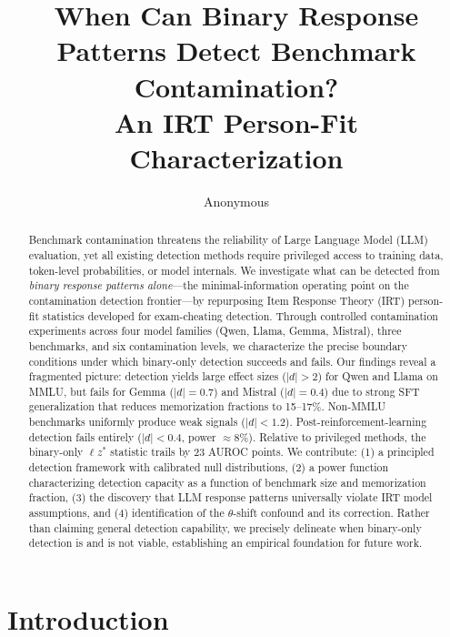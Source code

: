 \documentclass[11pt,a4paper]{article}
\title{When Can Binary Response Patterns Detect Benchmark Contamination?\\An IRT Person-Fit Characterization}
\author{Anonymous}
\date{}
\newcommand{\lzstar}{\ensuremath{\ell z^*}}
\begin{document}
\maketitle

\begin{abstract}
Benchmark contamination threatens the reliability of Large Language Model (LLM) evaluation, yet all existing detection methods require privileged access to training data, token-level probabilities, or model internals.
We investigate what can be detected from \emph{binary response patterns alone}---the minimal-information operating point on the contamination detection frontier---by repurposing Item Response Theory (IRT) person-fit statistics developed for exam-cheating detection.
Through controlled contamination experiments across four model families (Qwen, Llama, Gemma, Mistral), three benchmarks, and six contamination levels, we characterize the precise boundary conditions under which binary-only detection succeeds and fails.
Our findings reveal a fragmented picture: detection yields large effect sizes ($|d|>2$) for Qwen and Llama on MMLU, but fails for Gemma ($|d|=0.7$) and Mistral ($|d|=0.4$) due to strong SFT generalization that reduces memorization fractions to 15--17\%.
Non-MMLU benchmarks uniformly produce weak signals ($|d|<1.2$).
Post-reinforcement-learning detection fails entirely ($|d|<0.4$, power $\approx$8\%).
Relative to privileged methods, the binary-only $\lzstar$ statistic trails by 23 AUROC points.
We contribute: (1) a principled detection framework with calibrated null distributions, (2) a power function characterizing detection capacity as a function of benchmark size and memorization fraction, (3) the discovery that LLM response patterns universally violate IRT model assumptions, and (4) identification of the $\theta$-shift confound and its correction.
Rather than claiming general detection capability, we precisely delineate when binary-only detection is and is not viable, establishing an empirical foundation for future work.
\end{abstract}

\section{Introduction}
\end{document}
